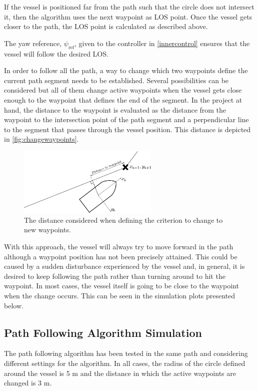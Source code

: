 If the vessel is positioned far from the path such that the circle does not intersect it, then the algorithm uses the next waypoint as LOS point. Once the vessel gets closer to the path, the LOS point is calculated as described above.

The yaw reference, $\psi_\mathrm{ref}$, given to the controller in \ref{innercontrol} ensures that the vessel will follow the desired LOS.

In order to follow all the path, a way to change which two waypoints define the current path segment needs to be established. Several possibilities can be considered but all of them change active waypoints when the vessel gets close enough to the waypoint that defines the end of the segment. In the project at hand, the distance to the waypoint is evaluated as the distance from the waypoint to the intersection point of the path segment and a perpendicular line to the segment that passes through the vessel position. This distance is depicted in \autoref{fig:changewaypoints}.
\begin{figure}[H]
	\includegraphics[width=0.6\textwidth]{figures/LOSalgorithmdistancewp}
	\caption{The distance considered when defining the criterion to change to new waypoints.}
	\label{fig:changewaypoints}
\end{figure}
With this approach, the vessel will always try to move forward in the path although a waypoint position has not been precisely attained. %
This could be caused by a sudden disturbance experienced by the vessel and, in general, it is desired to keep following the path rather than turning around to hit the waypoint. In most cases, the vessel itself is going to be close to the waypoint when the change occurs. This can be seen in the simulation plots presented below. 

\subsection{Path Following Algorithm Simulation}
The path following algorithm has been tested in the same path and considering different settings for the algorithm. In all cases, the radius of the circle defined around the vessel is 5 m and the distance in which the active waypoints are changed is 3 m. 

